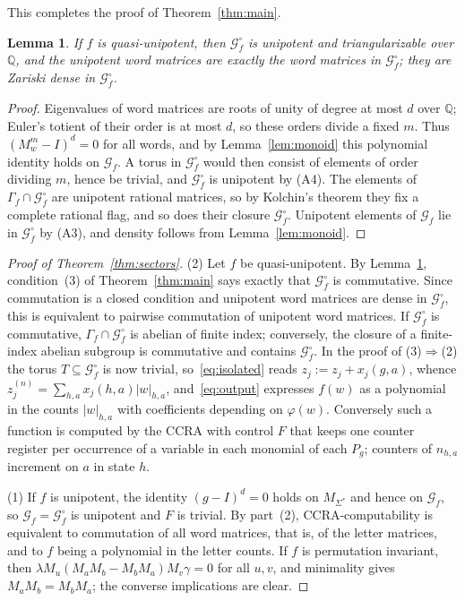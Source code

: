 \documentclass[acmlarge,screen,11pt,nonacm,natbib=false]{acmart}
\newcommand{\Q}{\mathbb{Q}}
\newcommand{\cG}{\mathcal{G}}
\newtheorem{lemma}[theorem]{Lemma}
\theoremstyle{definition}
\begin{document}
This completes the proof of Theorem~\ref{thm:main}.

\begin{lemma}\label{lem:qu}
If $f$ is quasi-unipotent, then $\cG_f^\circ$ is unipotent and triangularizable over $\Q$, and the unipotent word matrices are exactly the word matrices in $\cG_f^\circ$; they are Zariski dense in $\cG_f^\circ$.
\end{lemma}
\begin{proof}
Eigenvalues of word matrices are roots of unity of degree at most $d$ over $\Q$; Euler's totient of their order is at most $d$, so these orders divide a fixed $m$. Thus $(M_w^m-I)^d=0$ for all words, and by Lemma~\ref{lem:monoid} this polynomial identity holds on $\cG_f$. A torus in $\cG_f^\circ$ would then consist of elements of order dividing $m$, hence be trivial, and $\cG_f^\circ$ is unipotent by (A4). The elements of $\Gamma_f\cap\cG_f^\circ$ are unipotent rational matrices, so by Kolchin's theorem they fix a complete rational flag, and so does their closure $\cG_f^\circ$. Unipotent elements of $\cG_f$ lie in $\cG_f^\circ$ by (A3), and density follows from Lemma~\ref{lem:monoid}.
\end{proof}

\begin{proof}[Proof of Theorem~\ref{thm:sectors}]
(2) Let $f$ be quasi-unipotent. By Lemma~\ref{lem:qu}, condition~(3) of Theorem~\ref{thm:main} says exactly that $\cG_f^\circ$ is commutative. Since commutation is a closed condition and unipotent word matrices are dense in $\cG_f^\circ$, this is equivalent to pairwise commutation of unipotent word matrices. If $\cG_f^\circ$ is commutative, $\Gamma_f\cap\cG_f^\circ$ is abelian of finite index; conversely, the closure of a finite-index abelian subgroup is commutative and contains $\cG_f^\circ$. In the proof of (3)$\Rightarrow$(2) the torus $T\subseteq\cG_f^\circ$ is now trivial, so~\eqref{eq:isolated} reads $z_j:=z_j+x_j(g,a)$, whence $z_j^{(n)}=\sum_{h,a}x_j(h,a)|w|_{h,a}$, and~\eqref{eq:output} expresses $f(w)$ as a polynomial in the counts $|w|_{h,a}$ with coefficients depending on $\varphi(w)$. Conversely such a function is computed by the CCRA with control $F$ that keeps one counter register per occurrence of a variable in each monomial of each $P_g$; counters of $n_{h,a}$ increment on $a$ in state $h$.

(1) If $f$ is unipotent, the identity $(g-I)^d=0$ holds on $M_{\Sigma^*}$ and hence on $\cG_f$, so $\cG_f=\cG_f^\circ$ is unipotent and $F$ is trivial. By part~(2), CCRA-computability is equivalent to commutation of all word matrices, that is, of the letter matrices, and to $f$ being a polynomial in the letter counts. If $f$ is permutation invariant, then $\lambda M_u(M_aM_b-M_bM_a)M_v\gamma=0$ for all $u,v$, and minimality gives $M_aM_b=M_bM_a$; the converse implications are clear.
\end{proof}
\end{document}
